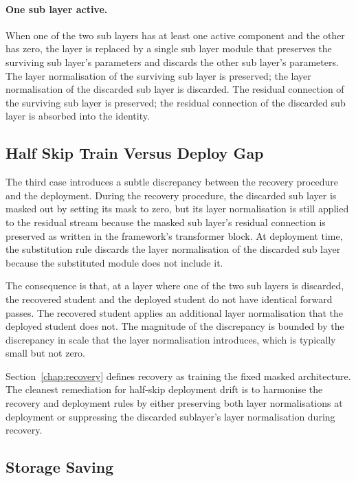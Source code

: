 \paragraph{One sub layer active.}
When one of the two sub layers has at least one active component and the other has zero, the layer is replaced by a single sub layer module that preserves the surviving sub layer's parameters and discards the other sub layer's parameters. The layer normalisation of the surviving sub layer is preserved; the layer normalisation of the discarded sub layer is discarded. The residual connection of the surviving sub layer is preserved; the residual connection of the discarded sub layer is absorbed into the identity.

\subsection{Half Skip Train Versus Deploy Gap}

The third case introduces a subtle discrepancy between the recovery procedure and the deployment. During the recovery procedure, the discarded sub layer is masked out by setting its mask to zero, but its layer normalisation is still applied to the residual stream because the masked sub layer's residual connection is preserved as written in the framework's transformer block. At deployment time, the substitution rule discards the layer normalisation of the discarded sub layer because the substituted module does not include it.

The consequence is that, at a layer where one of the two sub layers is discarded, the recovered student and the deployed student do not have identical forward passes. The recovered student applies an additional layer normalisation that the deployed student does not. The magnitude of the discrepancy is bounded by the discrepancy in scale that the layer normalisation introduces, which is typically small but not zero.

Section~\ref{chap:recovery} defines recovery as training the fixed masked architecture. The cleanest remediation for half-skip deployment drift is to harmonise the recovery and deployment rules by either preserving both layer normalisations at deployment or suppressing the discarded sublayer's layer normalisation during recovery.

\subsection{Storage Saving}

